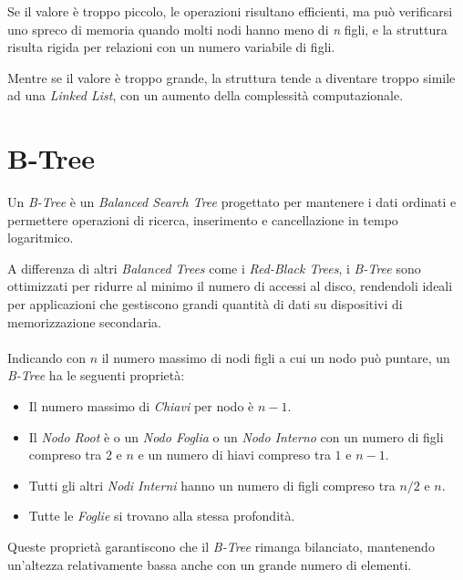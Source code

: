 \documentclass[12pt,a4paper,openright,twoside]{book}
\begin{document}
            Se il valore è troppo piccolo, le operazioni risultano efficienti, ma può verificarsi uno spreco di memoria quando molti nodi hanno meno di \textit{n} figli, e la struttura risulta rigida per relazioni con un numero variabile di figli.

            Mentre se il valore è troppo grande, la struttura tende a diventare troppo simile ad una \textit{Linked List}, con un aumento della complessità computazionale.

        \cite{cormen2022introduction}

    \section{B-Tree}

        Un \textit{B-Tree} è un \textit{Balanced Search Tree} progettato per mantenere i dati ordinati e permettere operazioni di ricerca, inserimento e cancellazione in tempo logaritmico.

        A differenza di altri \textit{Balanced Trees} come i \textit{Red-Black Trees}, i \textit{B-Tree} sono ottimizzati per ridurre al minimo il numero di accessi al disco, rendendoli ideali per applicazioni che gestiscono grandi quantità di dati su dispositivi di memorizzazione secondaria.

        \paragraph*{}

        Indicando con \( n \) il numero massimo di nodi figli a cui un nodo può puntare, un \textit{B-Tree} ha le seguenti proprietà:

        \begin{itemize}
            \item Il numero massimo di \textit{Chiavi} per nodo è \( n - 1 \).
            \item Il \textit{Nodo Root} è o un \textit{Nodo Foglia} o un \textit{Nodo Interno} con un numero di figli compreso tra \( 2 \) e \( n \) e un numero di hiavi compreso tra \( 1 \) e \( n - 1 \).
            \item Tutti gli altri \textit{Nodi Interni} hanno un numero di figli compreso tra \( n / 2 \) e \( n \).
            \item Tutte le \textit{Foglie} si trovano alla stessa profondità.
        \end{itemize}

        Queste proprietà garantiscono che il \textit{B-Tree} rimanga bilanciato, mantenendo un'altezza relativamente bassa anche con un grande numero di elementi.
\end{document}
